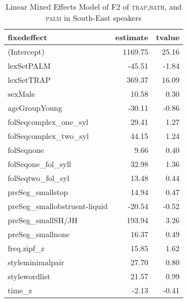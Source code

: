 \begin{table}[ht]
\centering
\begin{tabular}{lrr}
  \hline
fixedeffect & estimate & tvalue \\ 
  \hline
(Intercept) & 1169.75 & 25.16 \\ 
  lexSetPALM & -45.51 & -1.84 \\ 
  lexSetTRAP & 369.37 & 16.09 \\ 
  sexMale & 10.58 & 0.30 \\ 
  ageGroupYoung & -30.11 & -0.86 \\ 
  folSeqcomplex\_one\_syl & 29.41 & 1.27 \\ 
  folSeqcomplex\_two\_syl & 44.15 & 1.24 \\ 
  folSeqnone & 9.66 & 0.40 \\ 
  folSeqone\_fol\_syll & 32.98 & 1.36 \\ 
  folSeqtwo\_fol\_syl & 13.48 & 0.44 \\ 
  preSeg\_smallstop & 14.94 & 0.47 \\ 
  preSeg\_smallobstruent-liquid & -20.54 & -0.52 \\ 
  preSeg\_smallSH/JH & 193.94 & 3.26 \\ 
  preSeg\_smallnone & 16.37 & 0.49 \\ 
  freq.zipf\_z & 15.85 & 1.62 \\ 
  styleminimalpair & 27.70 & 0.80 \\ 
  stylewordlist & 21.57 & 0.99 \\ 
  time\_z & -2.13 & -0.41 \\ 
   \hline
\end{tabular}
\caption{Linear Mixed Effects Model of F2 of \textsc{trap},\textsc{bath}, and \textsc{palm} in South-East speakers \label{tbl:TBF1SE}} 
\end{table}

